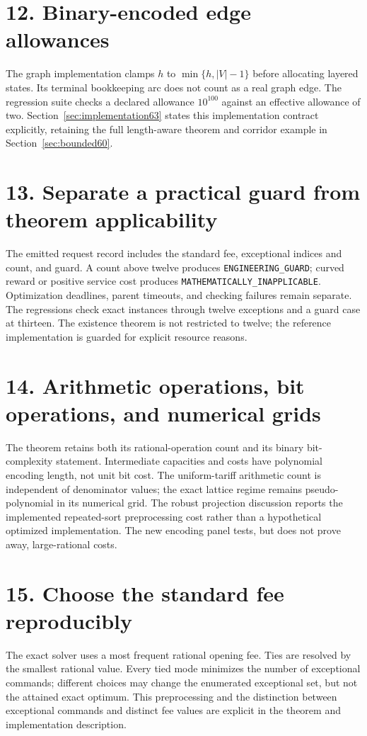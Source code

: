 \section*{12. Binary-encoded edge allowances}
The graph implementation clamps $h$ to $\min\{h,|V|-1\}$ before allocating layered states. Its terminal bookkeeping arc does not count as a real graph edge. The regression suite checks a declared allowance $10^{100}$ against an effective allowance of two. Section~\ref{sec:implementation63} states this implementation contract explicitly, retaining the full length-aware theorem and corridor example in Section~\ref{sec:bounded60}.

\section*{13. Separate a practical guard from theorem applicability}
The emitted request record includes the standard fee, exceptional indices and count, and guard. A count above twelve produces \texttt{ENGINEERING\_GUARD}; curved reward or positive service cost produces \texttt{MATHEMATICALLY\_INAPPLICABLE}. Optimization deadlines, parent timeouts, and checking failures remain separate. The regressions check exact instances through twelve exceptions and a guard case at thirteen. The existence theorem is not restricted to twelve; the reference implementation is guarded for explicit resource reasons.

\section*{14. Arithmetic operations, bit operations, and numerical grids}
The theorem retains both its rational-operation count and its binary bit-complexity statement. Intermediate capacities and costs have polynomial encoding length, not unit bit cost. The uniform-tariff arithmetic count is independent of denominator values; the exact lattice regime remains pseudo-polynomial in its numerical grid. The robust projection discussion reports the implemented repeated-sort preprocessing cost rather than a hypothetical optimized implementation. The new encoding panel tests, but does not prove away, large-rational costs.

\section*{15. Choose the standard fee reproducibly}
The exact solver uses a most frequent rational opening fee. Ties are resolved by the smallest rational value. Every tied mode minimizes the number of exceptional commands; different choices may change the enumerated exceptional set, but not the attained exact optimum. This preprocessing and the distinction between exceptional commands and distinct fee values are explicit in the theorem and implementation description.

